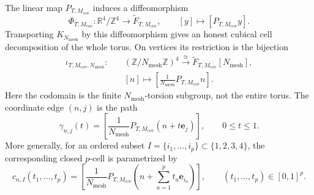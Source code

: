 \begin{proposition}
\label{cusp-link-cubical-realization}
The linear map \(P_{T,M_{\mathrm{cov}}}\) induces a diffeomorphism
\begin{equation}
 \Phi_{T,M_{\mathrm{cov}}}:\mathbb R^4/\mathbb Z^4
 \longrightarrow\widetilde F_{T,M_{\mathrm{cov}}},
 \qquad [y]\longmapsto[P_{T,M_{\mathrm{cov}}}y].
 \label{cusp-link-coordinate-diffeomorphism}
\end{equation}
Transporting \(K_{N_{\mathrm{mesh}}}\) by this diffeomorphism gives an
honest cubical cell decomposition of the whole torus.  On vertices its
restriction is the bijection
\begin{equation}
 \begin{aligned}
 \iota_{T,M_{\mathrm{cov}},N_{\mathrm{mesh}}}:\quad
 &(\mathbb Z/N_{\mathrm{mesh}}\mathbb Z)^4
 \xrightarrow{\ \cong\ }
 \widetilde F_{T,M_{\mathrm{cov}}}[N_{\mathrm{mesh}}],\\
 &[n]\longmapsto
 \left[\frac1{N_{\mathrm{mesh}}}P_{T,M_{\mathrm{cov}}}n\right].
 \end{aligned}
 \label{cusp-link-torsion-bijection}
\end{equation}
Here the codomain is the finite \(N_{\mathrm{mesh}}\)-torsion subgroup,
not the entire torus.  The coordinate edge \((n,j)\) is the path
\begin{equation}
 \gamma_{n,j}(t)=
 \left[
  \frac1{N_{\mathrm{mesh}}}
  P_{T,M_{\mathrm{cov}}}(n+t\mathbf e_j)
 \right],
 \qquad 0\leq t\leq1.
 \label{cusp-link-coordinate-edge}
\end{equation}
More generally, for an ordered subset
\(I=\{i_1,\ldots,i_p\}\subset\{1,2,3,4\}\), the corresponding closed
\(p\)-cell is parametrized by
\begin{equation}
 c_{n,I}(t_1,\ldots,t_p)=
 \left[
  \frac1{N_{\mathrm{mesh}}}P_{T,M_{\mathrm{cov}}}
  \left(n+\sum_{a=1}^pt_a\mathbf e_{i_a}\right)
 \right],
 \qquad (t_1,\ldots,t_p)\in[0,1]^p.
 \label{cusp-link-general-cell}
\end{equation}
\end{proposition}

